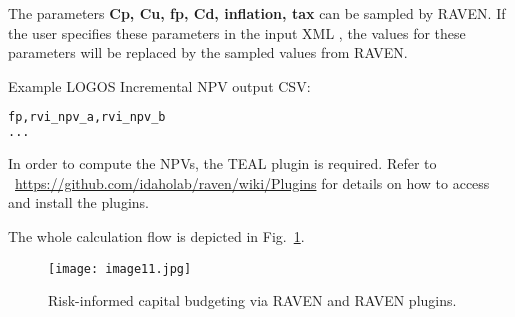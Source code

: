 The parameters \textbf{Cp, Cu, fp, Cd, inflation, tax} can be sampled by RAVEN.
If the user specifies these parameters in the input XML ,
the values for these parameters will be replaced by the sampled values from RAVEN.

Example LOGOS Incremental NPV output CSV:
\begin{lstlisting}[language=python]
fp,rvi_npv_a,rvi_npv_b
...
\end{lstlisting}

\nb In order to compute the NPVs, the TEAL plugin is required.
Refer to ~\url{https://github.com/idaholab/raven/wiki/Plugins} for
details on how to access and install the plugins.

The whole calculation flow is depicted in Fig.~\ref{fig:LogosRAVEN}.


\begin{figure}
    \centering
    \centerline{\texttt{[image: image11.jpg]}}
    \caption{Risk-informed capital budgeting via RAVEN and RAVEN plugins.}
    \label{fig:LogosRAVEN}
\end{figure}

